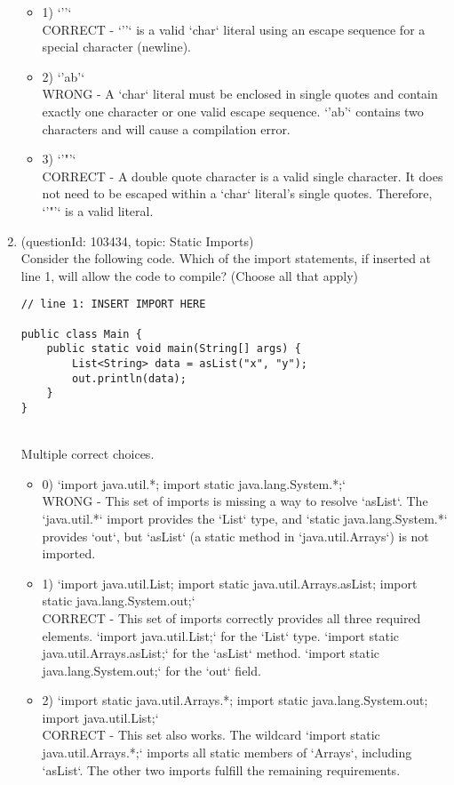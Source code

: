 \documentclass[12pt]{article}
\begin{document}
\begin{enumerate}[label=(\arabic*)]
\begin{itemize}
\item 1) `'\n'`
 \\ 
CORRECT - `'\n'` is a valid `char` literal using an escape sequence for a special character (newline).

\item 2) `'ab'`
 \\ 
WRONG - A `char` literal must be enclosed in single quotes and contain exactly one character or one valid escape sequence. `'ab'` contains two characters and will cause a compilation error.

\item 3) `'"'`
 \\ 
CORRECT - A double quote character is a valid single character. It does not need to be escaped within a `char` literal's single quotes. Therefore, `'"'` is a valid literal.

\end{itemize}
\item (questionId: 103434, topic: Static Imports) \\ 
Consider the following code. Which of the import statements, if inserted at line 1, will allow the code to compile? (Choose all that apply)
\begin{verbatim}
// line 1: INSERT IMPORT HERE

public class Main {
    public static void main(String[] args) {
        List<String> data = asList("x", "y");
        out.println(data);
    }
}
\end{verbatim}
\\ \noindent Multiple correct choices. 
\begin{itemize}
\item 0) `import java.util.*;
import static java.lang.System.*;`
 \\ 
WRONG - This set of imports is missing a way to resolve `asList`. The `java.util.*` import provides the `List` type, and `static java.lang.System.*` provides `out`, but `asList` (a static method in `java.util.Arrays`) is not imported.

\item 1) `import java.util.List;
import static java.util.Arrays.asList;
import static java.lang.System.out;`
 \\ 
CORRECT - This set of imports correctly provides all three required elements. `import java.util.List;` for the `List` type. `import static java.util.Arrays.asList;` for the `asList` method. `import static java.lang.System.out;` for the `out` field.

\item 2) `import static java.util.Arrays.*;
import static java.lang.System.out;
import java.util.List;`
 \\ 
CORRECT - This set also works. The wildcard `import static java.util.Arrays.*;` imports all static members of `Arrays`, including `asList`. The other two imports fulfill the remaining requirements.


\end{itemize}
\end{enumerate}
\end{document}
